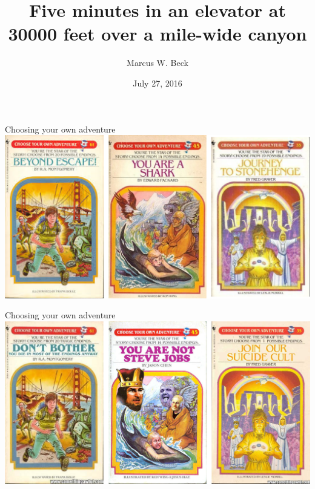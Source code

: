 \documentclass[serif]{beamer}\usepackage[]{graphicx}\usepackage[]{color}
\begin{document}
\title[NERRS Analysis Tools]{{\bf Five minutes in an elevator at 30000 feet over a mile-wide canyon}}

\author[M. Beck]{Marcus W. Beck}

\date{July 27, 2016}


\begin{frame}
\vspace{-0.1in}
\titlepage
\end{frame}

\begin{frame}{Choosing your own adventure}
\includegraphics[width = \textwidth]{fig/Picture1.png}
\end{frame}

\begin{frame}{Choosing your own adventure}
\includegraphics[width = \textwidth]{fig/Picture2.png}
\end{frame}
\end{document}
